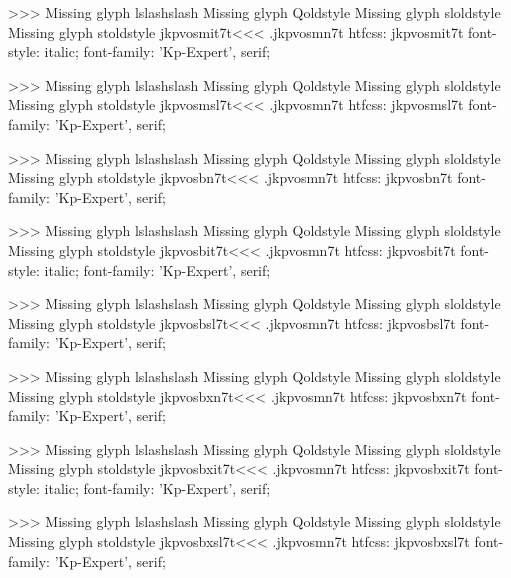 >>>
Missing glyph	lslashslash
Missing glyph	Qoldstyle
Missing glyph	sloldstyle
Missing glyph	stoldstyle
\<jkpvosmit7t\><<<
.jkpvosmn7t
htfcss:  jkpvosmit7t  font-style: italic; font-family: 'Kp-Expert', serif;

>>>
Missing glyph	lslashslash
Missing glyph	Qoldstyle
Missing glyph	sloldstyle
Missing glyph	stoldstyle
\<jkpvosmsl7t\><<<
.jkpvosmn7t
htfcss:  jkpvosmsl7t  font-family: 'Kp-Expert', serif;

>>>
Missing glyph	lslashslash
Missing glyph	Qoldstyle
Missing glyph	sloldstyle
Missing glyph	stoldstyle
\<jkpvosbn7t\><<<
.jkpvosmn7t
htfcss:  jkpvosbn7t  font-family: 'Kp-Expert', serif;

>>>
Missing glyph	lslashslash
Missing glyph	Qoldstyle
Missing glyph	sloldstyle
Missing glyph	stoldstyle
\<jkpvosbit7t\><<<
.jkpvosmn7t
htfcss:  jkpvosbit7t  font-style: italic; font-family: 'Kp-Expert', serif;

>>>
Missing glyph	lslashslash
Missing glyph	Qoldstyle
Missing glyph	sloldstyle
Missing glyph	stoldstyle
\<jkpvosbsl7t\><<<
.jkpvosmn7t
htfcss:  jkpvosbsl7t  font-family: 'Kp-Expert', serif;

>>>
Missing glyph	lslashslash
Missing glyph	Qoldstyle
Missing glyph	sloldstyle
Missing glyph	stoldstyle
\<jkpvosbxn7t\><<<
.jkpvosmn7t
htfcss:  jkpvosbxn7t  font-family: 'Kp-Expert', serif;

>>>
Missing glyph	lslashslash
Missing glyph	Qoldstyle
Missing glyph	sloldstyle
Missing glyph	stoldstyle
\<jkpvosbxit7t\><<<
.jkpvosmn7t
htfcss:  jkpvosbxit7t  font-style: italic; font-family: 'Kp-Expert', serif;

>>>
Missing glyph	lslashslash
Missing glyph	Qoldstyle
Missing glyph	sloldstyle
Missing glyph	stoldstyle
\<jkpvosbxsl7t\><<<
.jkpvosmn7t
htfcss:  jkpvosbxsl7t  font-family: 'Kp-Expert', serif;

